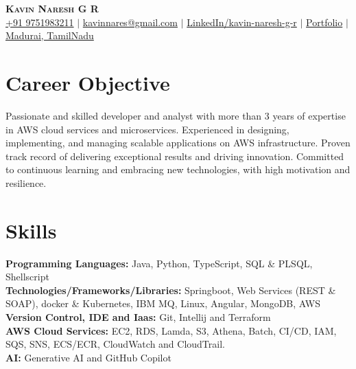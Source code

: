 \documentclass[letterpaper,10pt]{article}
\newcommand{\resumeSubHeadingListStart}{\begin{itemize}[leftmargin=0.15in, label={}]}
\newcommand{\resumeSubHeadingListEnd}{\end{itemize}}
\begin{document}
\begin{center}
    \textbf{\Huge \scshape Kavin Naresh G R} \\ \vspace{1pt}
    \small
    \textcolor{mygreen}{\faMobile \hspace{.5pt} \href{tel:9751983211}{+91 9751983211}}
    $|$
    \textcolor{myred}{\faAt \hspace{.5pt} \href{mailto:kavinnares@gmail.com}{kavinnares@gmail.com}}
    $|$
    \textcolor{RoyalBlue}{\faLinkedinSquare \hspace{.5pt} \href{https://www.linkedin.com/in/kavin-naresh-g-r/}{LinkedIn/kavin-naresh-g-r}}
    $|$
    \textcolor{myblue}{\faGlobe \hspace{.5pt} \href{https://kavinkavin16.github.io/portfolio/}{Portfolio}}
    $|$
    \textcolor{DarkOrchid}{\faMapMarker \hspace{.5pt} \href{https://maps.app.goo.gl/7d4xVmMTN6pnK8Dj8}{Madurai, TamilNadu}}
\end{center}

\section{Career Objective}
  \vspace{6pt}
Passionate and skilled developer and analyst with more than 3 years of expertise in AWS cloud services and microservices. Experienced in designing, implementing, and managing scalable applications on AWS infrastructure. Proven track record of delivering exceptional results and driving innovation. Committed to continuous learning and embracing new technologies, with high motivation and resilience.


\section{Skills}
  \vspace{3pt}
  \resumeSubHeadingListStart
    \small{\item{
        
        \textbf{Programming Languages:}{ Java, Python, TypeScript, SQL \& PLSQL, Shellscript} \\ \vspace{3pt}
        \textbf{Technologies/Frameworks/Libraries:}{ Springboot, Web Services (REST \& SOAP), docker \& Kubernetes, IBM MQ, Linux, Angular, MongoDB, AWS } \\ \vspace{3pt}
        \textbf{Version Control, IDE and Iaas:}{ Git, Intellij and Terraform } \\ \vspace{3pt}
        \textbf{AWS Cloud Services:}{ EC2, RDS, Lamda, S3, Athena, Batch, CI/CD, IAM, SQS, SNS, ECS/ECR, CloudWatch and CloudTrail. } \\ \vspace{3pt}
        \textbf{AI:}{ Generative AI and GitHub Copilot} \\ \vspace{3pt}
    }}
  \resumeSubHeadingListEnd
\end{document}
